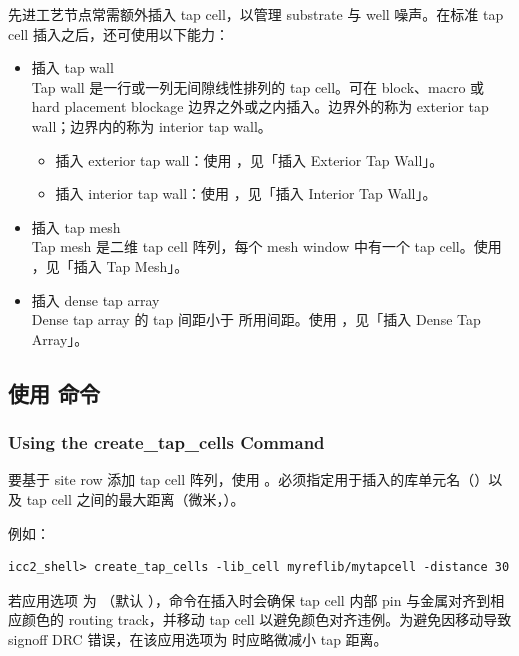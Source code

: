 先进工艺节点常需额外插入 tap cell，以管理 substrate 与 well 噪声。在标准 tap cell 插入之后，还可使用以下能力：
\begin{itemize}
  \item 插入 tap wall\\
        Tap wall 是一行或一列无间隙线性排列的 tap cell。可在 block、macro 或 hard placement blockage 边界之外或之内插入。边界外的称为 exterior tap wall；边界内的称为 interior tap wall。
        \begin{itemize}
          \item 插入 exterior tap wall：使用 ，见「插入 Exterior Tap Wall」。
          \item 插入 interior tap wall：使用 ，见「插入 Interior Tap Wall」。
        \end{itemize}
  \item 插入 tap mesh\\
        Tap mesh 是二维 tap cell 阵列，每个 mesh window 中有一个 tap cell。使用 ，见「插入 Tap Mesh」。
  \item 插入 dense tap array\\
        Dense tap array 的 tap 间距小于  所用间距。使用 ，见「插入 Dense Tap Array」。
\end{itemize}

\subsection{使用  命令}
\subsubsection*{Using the create\_tap\_cells Command}

要基于 site row 添加 tap cell 阵列，使用 。必须指定用于插入的库单元名（）以及 tap cell 之间的最大距离（微米，）。

例如：
\begin{lstlisting}
icc2_shell> create_tap_cells -lib_cell myreflib/mytapcell -distance 30
\end{lstlisting}

\begin{noteBox}
若应用选项  为 （默认 ），命令在插入时会确保 tap cell 内部 pin 与金属对齐到相应颜色的 routing track，并移动 tap cell 以避免颜色对齐违例。为避免因移动导致 signoff DRC 错误，在该应用选项为  时应略微减小 tap 距离。
\end{noteBox}

